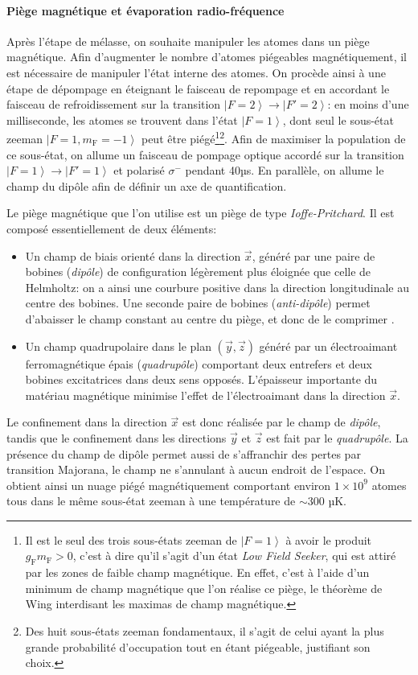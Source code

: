 \paragraph*{Piège magnétique et évaporation radio-fréquence}
Après l'étape de mélasse, on souhaite manipuler les atomes dans un piège magnétique. Afin d'augmenter le nombre d'atomes piégeables magnétiquement, il est nécessaire de manipuler l'état interne des atomes. On procède ainsi à une étape de dépompage en éteignant le faisceau de repompage et en accordant le faisceau de refroidissement sur la transition $\left| F=2 \right\rangle \rightarrow\left| F'=2 \right\rangle$: en moins d'une milliseconde, les atomes se trouvent dans l'état $\left| F=1 \right\rangle$, dont seul le sous-état zeeman $\left| F=1, m_{\mathrm{F}}=-1 \right\rangle$ peut être piégé\footnote{Il est le seul des trois sous-états zeeman de $\left| F=1 \right\rangle$ à avoir le produit $g_{\mathrm{F}} m_{\mathrm{F}} > 0$, c'est à dire qu'il s'agit d'un état \emph{Low Field Seeker}, qui est attiré par les zones de faible champ magnétique. En effet, c'est à l'aide d'un minimum de champ magnétique que l'on réalise ce piège, le théorème de Wing interdisant les maximas de champ magnétique. }\footnote{Des huit sous-états zeeman fondamentaux, il s'agit de celui ayant la plus grande probabilité d'occupation tout en étant piégeable, justifiant son choix. }. Afin de maximiser la population de ce sous-état, on allume un faisceau de pompage optique accordé sur la transition $\left| F=1 \right\rangle \rightarrow \left| F'=1 \right\rangle$ et polarisé $\sigma^-$ pendant 40µs. En parallèle, on allume le champ du dipôle afin de définir un axe de quantification.

Le piège magnétique que l'on utilise est un piège de type \emph{Ioffe-Pritchard}. Il est composé essentiellement de deux éléments:
\begin{itemize}
\item[\textendash] Un champ de biais orienté dans la direction $\vec{x}$, généré par une paire de bobines (\emph{dipôle}) de configuration légèrement plus éloignée que celle de Helmholtz: on a ainsi une courbure positive dans la direction longitudinale au centre des bobines. Une seconde paire de bobines (\emph{anti-dipôle}) permet d'abaisser le champ constant au centre du piège, et donc de le comprimer \citep{fauquembergue2004realisation}.
\item[\textendash] Un champ quadrupolaire dans le plan $(\vec{y},\vec{z})$ généré par un électroaimant ferromagnétique épais (\emph{quadrupôle}) comportant deux entrefers et deux bobines excitatrices dans deux sens opposés. L'épaisseur importante du matériau magnétique minimise l'effet de l'électroaimant dans la direction $\vec{x}$.
\end{itemize}
Le confinement dans la direction $\vec{x}$ est donc réalisée par le champ de \emph{dipôle}, tandis que le confinement dans les directions $\vec{y}$ et $\vec{z}$ est fait par le \emph{quadrupôle}. 
La présence du champ de dipôle permet aussi de s'affranchir des pertes par transition Majorana, le champ ne s'annulant à aucun endroit de l'espace.
On obtient ainsi un nuage piégé magnétiquement comportant environ $1 \times 10^9$ atomes tous dans le même sous-état zeeman à une température de $\sim 300$ µK.

